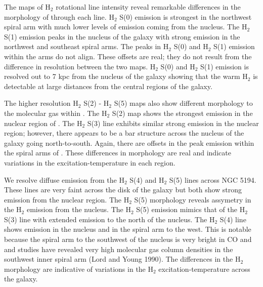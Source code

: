 \documentclass[manuscript]{aastex}
\begin{document}
The maps of $\mathrm{H_2}$ rotational line intensity reveal remarkable differences in the morphology of  through each line.  $\mathrm{H_2}$ S(0) emission is strongest in the northwest spiral arm with much lower levels of emission coming from the nucleus.  The $\mathrm{H_2}$ S(1) emission peaks in the nucleus of the galaxy with strong emission in the northwest and southeast spiral arms.  The peaks in $\mathrm{H_2}$ S(0) and $\mathrm{H_2}$ S(1) emission within the arms do not align.  These offsets are real; they do not result from the difference in resolution between the two maps. $\mathrm{H_2}$ S(0) and $\mathrm{H_2}$ S(1) emission is resolved out to 7 kpc from the nucleus of the galaxy showing that the warm $\mathrm{H_2}$ is detectable at large distances from the central regions of the galaxy. 

The higher resolution $\mathrm{H_2}$ S(2) - $\mathrm{H_2}$ S(5) maps also show different morphology to the molecular gas within .  The $\mathrm{H_2}$ S(2) map shows the strongest emission in the nuclear region of .  The $\mathrm{H_2}$ S(3) line exhibits similar strong emission in the nuclear region; however, there appears to be a bar structure across the nucleus of the galaxy going north-to-south.  Again, there are offsets in the peak emission within the spiral arms of .  These differences in morphology are real and indicate variations in the excitation-temperature in each region.

We resolve diffuse emission from the $\mathrm{H_2}$ S(4) and $\mathrm{H_2}$ S(5) lines across NGC 5194.  These lines are very faint across the disk of the galaxy but both show strong emission from the nuclear region.
The $\mathrm{H_2}$ S(5) morphology reveals assymetry in the $\mathrm{H_2}$ emission from the nucleus.  The $\mathrm{H_2}$ S(5) emission mimics that of the $\mathrm{H_2}$ S(3) line with extended emission to the north of the nucleus.  The $\mathrm{H_2}$ S(4) line shows emission in the nucleus and in the spiral arm to the west.  This is notable because the spiral arm to the southwest of the nucleus is very bright in CO and and studies have revealed very high molecular gas column densities in the southwest inner spiral arm (Lord and Young 1990).  The differences in the $\mathrm{H_2}$ morphology are indicative of variations in the $\mathrm{H_2}$ excitation-temperature across the galaxy.  
\end{document}

